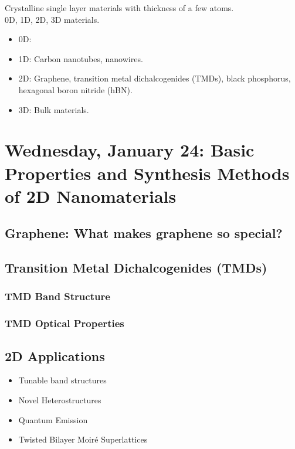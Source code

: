 \documentclass[10pt, oneside]{article}
\begin{document}
Crystalline single layer materials with thickness of a few atoms.\\
0D, 1D, 2D, 3D materials.
\begin{itemize}
\item 0D: 
\item 1D: Carbon nanotubes, nanowires.
\item 2D: Graphene, transition metal dichalcogenides (TMDs), black phosphorus, hexagonal boron nitride (hBN).
\item 3D: Bulk materials.
\end{itemize}

\section{Wednesday, January 24: Basic Properties and Synthesis Methods of 2D Nanomaterials}

\subsection{Graphene: What makes graphene so special?}

\subsection{Transition Metal Dichalcogenides (TMDs)}

\subsubsection{TMD Band Structure}

\subsubsection{TMD Optical Properties}

\subsection{2D Applications}

\begin{itemize}
\item Tunable band structures
\item Novel Heterostructures
\item Quantum Emission
\item Twisted Bilayer Moir\'e Superlattices
\end{itemize}
\end{document}
